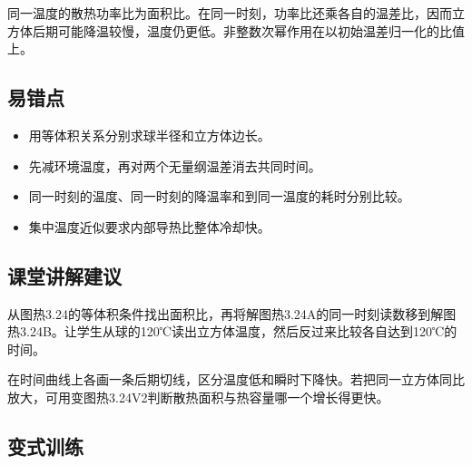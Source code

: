 \documentclass[UTF8,fontset=fandol,a4paper,11pt]{ctexart}
\begin{document}
同一温度的散热功率比为面积比。在同一时刻，功率比还乘各自的温差比，因而立方体后期可能降温较慢，温度仍更低。非整数次幂作用在以初始温差归一化的比值上。



\subsection*{易错点}

\begin{itemize}
\item 用等体积关系分别求球半径和立方体边长。
\item 先减环境温度，再对两个无量纲温差消去共同时间。
\item 同一时刻的温度、同一时刻的降温率和到同一温度的耗时分别比较。
\item 集中温度近似要求内部导热比整体冷却快。
\end{itemize}



\subsection*{课堂讲解建议}

从图热3.24的等体积条件找出面积比，再将解图热3.24A的同一时刻读数移到解图热3.24B。让学生从球的120℃读出立方体温度，然后反过来比较各自达到120℃的时间。

在时间曲线上各画一条后期切线，区分温度低和瞬时下降快。若把同一立方体同比放大，可用变图热3.24V2判断散热面积与热容量哪一个增长得更快。



\subsection*{变式训练}
\end{document}
